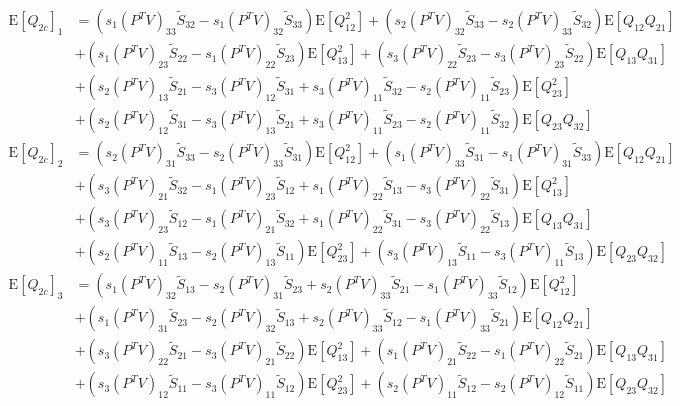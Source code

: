 \documentclass[10pt]{article}
\newcommand{\expect}[1]{\ensuremath{\mathrm{E}\left[ #1 \right]}}
\begin{document}
\begin{align} \label{eqn:Q2c}
	\expect{Q_{2c}}_1 &= \left( s_1(P^TV)_{33}\tilde{S}_{32} - s_1(P^TV)_{32}\tilde{S}_{33} \right) \expect{Q_{12}^2} + \left( s_2(P^TV)_{32}\tilde{S}_{33} - s_2(P^TV)_{33}\tilde{S}_{32} \right) \expect{Q_{12}Q_{21}} \nonumber \\
	&+ \left( s_1(P^TV)_{23}\tilde{S}_{22} - s_1(P^TV)_{22}\tilde{S}_{23} \right) \expect{Q_{13}^2} + \left( s_3(P^TV)_{22}\tilde{S}_{23} - s_3(P^TV)_{23}\tilde{S}_{22} \right) \expect{Q_{13}Q_{31}} \nonumber \\
	&+ \left( s_2(P^TV)_{13}\tilde{S}_{21} - s_3(P^TV)_{12}\tilde{S}_{31} + s_3(P^TV)_{11}\tilde{S}_{32} - s_2(P^TV)_{11}\tilde{S}_{23} \right) \expect{Q_{23}^2} \nonumber \\
	&+ \left( s_2(P^TV)_{12}\tilde{S}_{31} - s_3(P^TV)_{13}\tilde{S}_{21} + s_3(P^TV)_{11}\tilde{S}_{23} - s_2(P^TV)_{11}\tilde{S}_{32} \right) \expect{Q_{23}Q_{32}} \nonumber\\ 
	\expect{Q_{2c}}_2 &= \left( s_2(P^TV)_{31}\tilde{S}_{33} - s_2(P^TV)_{33}\tilde{S}_{31} \right) \expect{Q_{12}^2} + \left( s_1(P^TV)_{33}\tilde{S}_{31} - s_1(P^TV)_{31}\tilde{S}_{33} \right) \expect{Q_{12}Q_{21}} \nonumber \\
	&+ \left( s_3(P^TV)_{21}\tilde{S}_{32} - s_1(P^TV)_{23}\tilde{S}_{12} + s_1(P^TV)_{22}\tilde{S}_{13} - s_3(P^TV)_{22}\tilde{S}_{31} \right) \expect{Q_{13}^2} \nonumber \\
	&+ \left( s_3(P^TV)_{23}\tilde{S}_{12} - s_1(P^TV)_{21}\tilde{S}_{32} +  s_1(P^TV)_{22}\tilde{S}_{31} - s_3(P^TV)_{22}\tilde{S}_{13} \right) \expect{Q_{13}Q_{31}} \nonumber \\
	&+ \left( s_2(P^TV)_{11}\tilde{S}_{13} - s_2(P^TV)_{13}\tilde{S}_{11} \right) \expect{Q_{23}^2} + \left( s_3(P^TV)_{13}\tilde{S}_{11} - s_3(P^TV)_{11}\tilde{S}_{13} \right) \expect{Q_{23}Q_{32}} \nonumber\\ 
	\expect{Q_{2c}}_3 &= \left( s_1(P^TV)_{32}\tilde{S}_{13} - s_2(P^TV)_{31}\tilde{S}_{23} + s_2(P^TV)_{33}\tilde{S}_{21} - s_1(P^TV)_{33}\tilde{S}_{12} \right) \expect{Q_{12}^2} \nonumber \\
	&+ \left( s_1(P^TV)_{31}\tilde{S}_{23} - s_2(P^TV)_{32}\tilde{S}_{13} + s_2(P^TV)_{33}\tilde{S}_{12} - s_1(P^TV)_{33}\tilde{S}_{21} \right) \expect{Q_{12}Q_{21}} \nonumber \\
	&+ \left( s_3(P^TV)_{22}\tilde{S}_{21} - s_3(P^TV)_{21}\tilde{S}_{22} \right) \expect{Q_{13}^2} + \left( s_1(P^TV)_{21}\tilde{S}_{22} - s_1(P^TV)_{22}\tilde{S}_{21} \right) \expect{Q_{13}Q_{31}} \nonumber \\
	&+ \left( s_3(P^TV)_{12}\tilde{S}_{11} - s_3(P^TV)_{11}\tilde{S}_{12} \right) \expect{Q_{23}^2} + \left( s_2(P^TV)_{11}\tilde{S}_{12} - s_2(P^TV)_{12}\tilde{S}_{11} \right) \expect{Q_{23}Q_{32}} \nonumber\\ 
\end{align}
\end{document}
